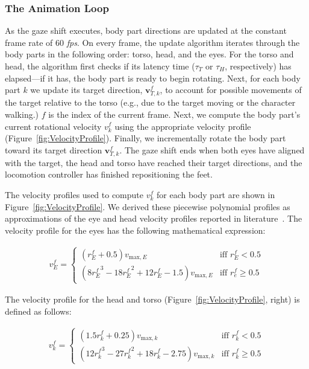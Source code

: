 \subsubsection{The Animation Loop}

As the gaze shift executes, body part directions are updated at the constant frame rate of 60 \emph{fps}. On every frame, the update algorithm iterates through the body parts in the following order: torso, head, and the eyes. For the torso and head, the algorithm first checks if its latency time ($\tau_T$ or $\tau_H$, respectively) has elapsed---if it has, the body part is ready to begin rotating. Next, for each body part $k$ we update its target direction, $\mathbf{v}^f_{T,k}$, to account for possible movements of the target relative to the torso (e.g., due to the target moving or the character walking.) $f$ is the index of the current frame. Next, we compute the body part's current rotational velocity $v^f_k$ using the appropriate velocity profile (Figure~\ref{fig:VelocityProfile}). Finally, we incrementally rotate the body part toward its target direction $\mathbf{v}^f_{T,k}$. The gaze shift ends when both eyes have aligned with the target, the head and torso have reached their target directions, and the locomotion controller has finished repositioning the feet.

The velocity profiles used to compute $v^f_k$ for each body part are shown in Figure~\ref{fig:VelocityProfile}. We derived these piecewise polynomial profiles as approximations of the eye and head velocity profiles reported in literature~\cite{kim2007head,lee2002eyes}. The velocity profile for the eyes has the following mathematical expression:

\begin{align} \label{eq:EyeVelocity}
v^f_E = \begin{cases}
(r^f_E + 0.5)v_{\mathrm{max},E} & \mbox{iff } r^f_E < 0.5 \\
(8{r^f_E}^3 - 18{r^f_E}^2 + 12r^f_E - 1.5)v_{\mathrm{max},E} & \mbox{iff } r^f_e \geq 0.5
\end{cases}
\end{align}

The velocity profile for the head and torso (Figure~\ref{fig:VelocityProfile}, right) is defined as follows:

\begin{align} \label{eq:HeadTorsoVelocity}
v^f_k = \begin{cases}
(1.5r^f_k + 0.25)v_{\mathrm{max},k} & \mbox{iff } r^f_k < 0.5 \\
(12{r^f_k}^3 - 27{r^f_k}^2 + 18r^f_k - 2.75)v_{\mathrm{max},k} & \mbox{iff } r^f_k \geq 0.5
\end{cases}
\end{align}

